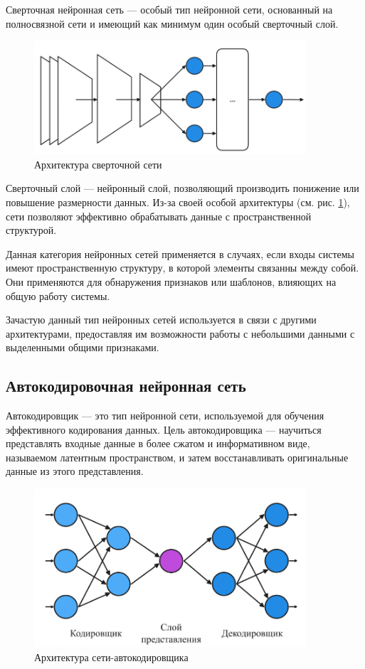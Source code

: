 Сверточная нейронная сеть — особый тип нейронной сети, основанный на
полносвязной сети и имеющий как минимум один особый сверточный слой. 

\begin{figure}[H]
  \centering
    \includegraphics[width=0.9\textwidth]{figures/arch_cnn.png}
  \caption{Архитектура сверточной сети}\label{fig:cnn}
\end{figure}

Сверточный слой — нейронный слой, позволяющий производить понижение или
повышение размерности данных. Из-за своей особой архитектуры (см. рис.
\ref{fig:cnn}), сети позволяют эффективно обрабатывать данные с пространственной
структурой.

Данная категория нейронных сетей применяется в случаях, если входы системы имеют
пространственную структуру, в которой элементы связанны между собой. Они
применяются для обнаружения признаков или шаблонов, влияющих на общую работу
системы.

Зачастую данный тип нейронных сетей используется в связи с другими
архитектурами, предоставляя им возможности работы с небольшими данными с
выделенными общими признаками.

\subsection{Автокодировочная нейронная сеть}

Автокодировщик — это тип нейронной сети, используемой для обучения эффективного
кодирования данных. Цель автокодировщика — научиться представлять входные данные
в более сжатом и информативном виде, называемом латентным пространством, и затем
восстанавливать оригинальные данные из этого представления. 
\begin{figure}[H]
  \centering
    \includegraphics[width=0.9\textwidth]{figures/arch_autoencoder.png}
  \caption{Архитектура сети-автокодировщика}\label{fig:autoencoder}
\end{figure}

